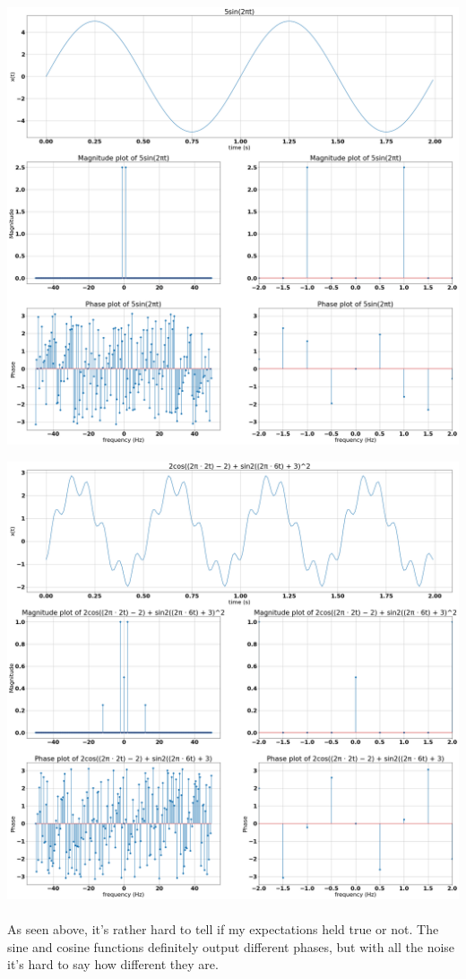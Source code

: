 \documentclass[12pt]{report}
\begin{document}
    \includegraphics[scale=0.25]{Figure 2022-03-22 205111 (1).png}
    
    \includegraphics[scale=0.25]{Figure 2022-03-22 205111 (2).png}
    
    \paragraph{} As seen above, it's rather hard to tell if my expectations held true or not. The sine and cosine functions definitely output different phases, but with all the noise it's hard to say how different they are. 
    
\end{document}
